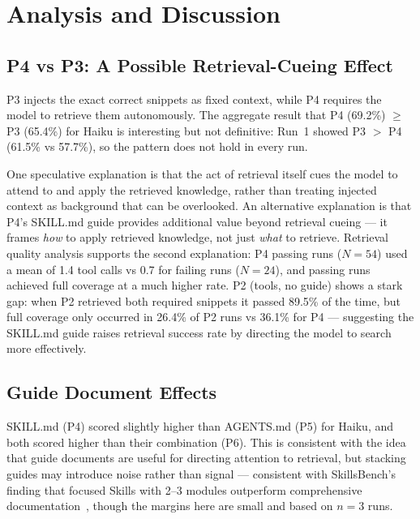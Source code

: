 \documentclass[10pt,a4paper,twocolumn]{article}
\begin{document}
\section{Analysis and Discussion}
\label{sec:discussion}

\subsection{P4 vs P3: A Possible Retrieval-Cueing Effect}
\label{sec:p4-vs-p3}

P3 injects the exact correct snippets as fixed context, while P4
requires the model to retrieve them autonomously.
The aggregate result that P4 (69.2\%) $\geq$ P3 (65.4\%) for Haiku is
interesting but not definitive: Run~1 showed P3 $>$ P4 (61.5\% vs
57.7\%), so the pattern does not hold in every run.

One speculative explanation is that the act of retrieval itself cues the
model to attend to and apply the retrieved knowledge, rather than
treating injected context as background that can be overlooked.
An alternative explanation is that P4's SKILL.md guide provides
additional value beyond retrieval cueing --- it frames \emph{how} to
apply retrieved knowledge, not just \emph{what} to retrieve.
Retrieval quality analysis supports the second explanation: P4 passing
runs ($N{=}54$) used a mean of 1.4 tool calls vs 0.7 for failing runs
($N{=}24$), and passing runs achieved full coverage at a much higher
rate.
P2 (tools, no guide) shows a stark gap: when P2 retrieved both required
snippets it passed 89.5\% of the time, but full coverage only occurred
in 26.4\% of P2 runs vs 36.1\% for P4 --- suggesting the SKILL.md guide
raises retrieval success rate by directing the model to search more
effectively.

\subsection{Guide Document Effects}
\label{sec:guide-effects}

SKILL.md (P4) scored slightly higher than AGENTS.md (P5) for Haiku, and
both scored higher than their combination (P6).
This is consistent with the idea that guide documents are useful for
directing attention to retrieval, but stacking guides may introduce noise
rather than signal --- consistent with SkillsBench's finding that focused
Skills with 2--3 modules outperform comprehensive
documentation~\citep{li2026skillsbench}, though the margins here are
small and based on $n{=}3$ runs.
\end{document}
